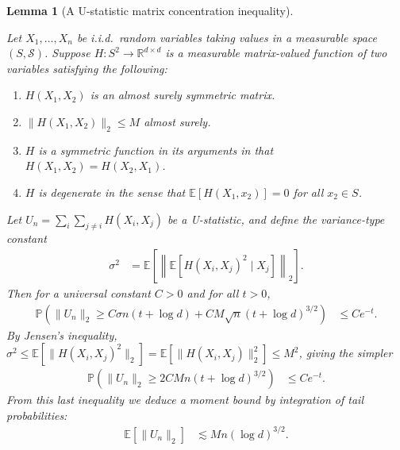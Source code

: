 \documentclass[11pt,lof]{puthesis}
\renewcommand{\P}{\ensuremath{\mathbb{P}}}
\newcommand{\R}{\ensuremath{\mathbb{R}}}
\newcommand{\E}{\ensuremath{\mathbb{E}}}
\newcommand{\cS}{\ensuremath{\mathcal{S}}}
\theoremstyle{break}
\newtheorem{lemma}{Lemma}[section]
\theoremstyle{proof}
\begin{document}
\begin{lemma}[A U-statistic matrix concentration inequality]
\label{lem:kernel_app_ustat_matrix_concentration}

Let $X_1, \ldots, X_n$ be i.i.d.\ random variables
taking values in a measurable space $(S, \cS)$.
Suppose
$H: S^2 \to \R^{d \times d}$
is a measurable matrix-valued function
of two variables
satisfying the following:
%
\begin{enumerate}[label=(\roman*)]

\item
$H(X_1, X_2)$ is an almost surely symmetric matrix.

\item
$\|H(X_1, X_2)\|_2 \leq M$ almost surely.

\item
$H$ is a symmetric function in its arguments in that
$H(X_1, X_2) = H(X_2, X_1)$.

\item
$H$ is degenerate in the sense that
$\E[H(X_1, x_2)] = 0$ for all $x_2 \in S$.

\end{enumerate}
%
Let $U_n = \sum_i \sum_{j \neq i} H(X_i, X_j)$
be a U-statistic,
and define the variance-type constant
%
\begin{align*}
\sigma^2
&=
\E\left[
\left\|
\E\left[
H(X_i, X_j)^2
\mid X_j
\right]
\right\|_2
\right].
\end{align*}
%
Then for a universal constant $C > 0$
and for all $t > 0$,
%
\begin{align*}
\P\left(
\|U_n\|_2
\geq
C \sigma n (t + \log d)
+ C M \sqrt{n} (t + \log d)^{3/2}
\right)
&\leq
C e^{-t}.
\end{align*}
%
By Jensen's inequality,
$\sigma^2 \leq \E[ \| H(X_i, X_j)^2 \|_2 ]
= \E[ \| H(X_i, X_j) \|_2^2 ] \leq M^2$, giving the simpler
%
\begin{align*}
\P\left(
\|U_n\|_2
\geq
2 C M n
(t + \log d)^{3/2}
\right)
&\leq
C e^{-t}.
\end{align*}
%
From this last inequality we deduce a moment bound
by integration of tail probabilities:
%
\begin{align*}
\E\left[
\|U_n\|_2
\right]
&\lesssim
M n (\log d)^{3/2}.
\end{align*}

\end{lemma}
\end{document}
